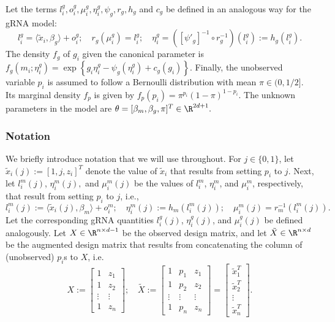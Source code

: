 \documentclass[11pt]{article}
\begin{document}
Let the terms $l^g_i, o^g_i, \mu^g_i, \eta^g_i, \psi_g, r_g, h_g$ and $c_g$ be defined in an analogous way for the gRNA model:
$$
l^g_i = \langle \tilde{x}_i, \beta_g \rangle + o^g_i; \quad
r_g(\mu^g_i) = l^g_i; \quad
\eta^g_i = \left([\psi'_g]^{-1} \circ r^{-1}_g\right)(l_i^g) := h_g(l_i^g).
$$
The density $f_g$ of $g_i$ given the canonical parameter is $f_g(m_i; \eta^g_i) = \exp\left\{g_i \eta^g_i - \psi_g(\eta^g_i) + c_g(g_i)\right\}.$
Finally, the unobserved variable $p_i$ is assumed to follow a Bernoulli distribution with mean $\pi \in (0, 1/2]$. Its marginal density $f_p$ is given by $f_p(p_i) = \pi^{p_i}(1-\pi)^{1 - p_i}.$
The unknown parameters in the model are
$\theta = [\beta_m, \beta_g, \pi]^{T}  \in \R^{2d + 1}.$

\subsubsection*{Notation}
We briefly introduce notation that we will use throughout. For $j \in \{0,1\}$, let $\tilde{x}_i(j) := [1, j, z_i]^T$ denote the value of $\tilde{x}_i$ that results from setting $p_i$ to $j$. Next, let  $l^m_i(j)$, $\eta^m_i(j),$ and $\mu^m_i(j)$ be the values of $l^m_i$, $\eta^m_i$, and $\mu^m_i$, respectively, that result from setting $p_i$ to $j$, i.e.,
$$
l^m_i(j) := \langle \tilde{x}_i(j), \beta_m \rangle + o^m_i; \quad \eta^m_i(j) := h_m(l^m_i(j)); \quad
\mu_i^m(j) = r_m^{-1}(l^m_i(j)).
$$
Let the corresponding gRNA quantities $l^g_i(j)$, $\eta_i^g(j)$, and $\mu^g_i(j)$ be defined analogously. Let $X \in \R^{n \times {d-1}}$ be the observed design matrix, and let $\tilde{X} \in \R^{n \times d}$ be the augmented design matrix that results from concatenating the column of (unobserved) $p_i$s to $X$, i.e.
$$X := \begin{bmatrix} 
1 & z_1 \\
1 & z_2 \\
\vdots & \vdots \\
1 & z_n
\end{bmatrix}; \quad 
\tilde{X}  := 
\begin{bmatrix}
1 & p_1 & z_1 \\
1 & p_2 & z_2 \\ 
\vdots & \vdots & \vdots \\
1 & p_n & z_n
\end{bmatrix} = \begin{bmatrix}
\tilde{x}_1^T \\ \tilde{x}_2^T \\ \vdots \\ \tilde{x}_n^T
\end{bmatrix}.
$$ 
\end{document}
